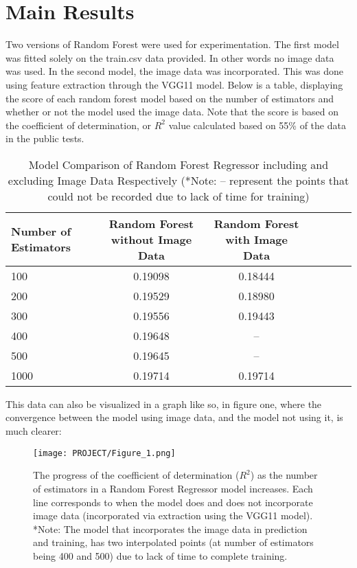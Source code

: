 \documentclass{article}
\begin{document}
\section{Main Results}
Two versions of Random Forest were used for experimentation. The first model was fitted solely on the train.csv data provided. In other words no image data was used. In the second model, the image data was incorporated. This was done using feature extraction through the VGG11 model. Below is a table, displaying the score of each random forest model based on the number of estimators and whether or not the model used the image data. Note that the score is based on the coefficient of determination, or $R^2$ value calculated based on 55\% of the data in the public tests.

\begin{table}[H]
\caption{Model Comparison of Random Forest Regressor including and excluding Image Data Respectively (*Note: -- represent the points that could not be recorded due to lack of time for training)}
\begin{tabular}{@{}lcccccc@{}}
\toprule 
\multirow{1}{*}{Number of Estimators} & {Random Forest without Image Data}      & {Random Forest with Image Data}               \\ \midrule                             
100           & 0.19098    & 0.18444                               \\
200        & 0.19529    & 0.18980                          \\
300        & 0.19556           & 0.19443                 \\
400       & 0.19648    & --                           \\
500    & 0.19645           & --               \\
1000    & 0.19714             & 0.19714             \\
\bottomrule
\end{tabular}
\end{table}

This data can also be visualized in a graph like so, in figure one, where the convergence between the model using image data, and the model not using it, is much clearer:

\begin{figure*}[h]
    \centering
    \texttt{[image: PROJECT/Figure\_1.png]}
    \caption{The progress of the coefficient of determination ($R^2$) as the number of estimators in a Random Forest Regressor model increases. Each line corresponds to when the model does and does not incorporate image data (incorporated via extraction using the VGG11 model). *Note: The model that incorporates the image data in prediction and training, has two interpolated points (at number of estimators being 400 and 500) due to lack of time to complete training.}
    \label{fig:eqv_sde_traj}
\end{figure*}
\end{document}
